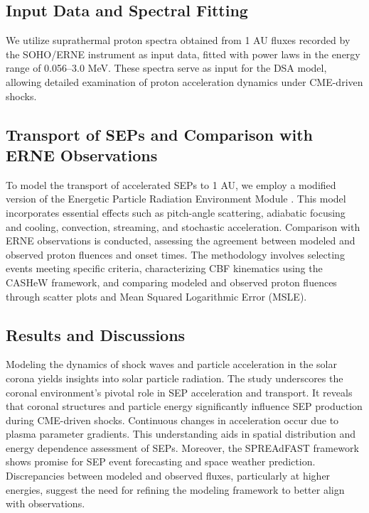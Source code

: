 \subsection{Input Data and Spectral Fitting}
We utilize suprathermal proton spectra obtained from 1 AU fluxes recorded by the SOHO/ERNE instrument \citep{torsti_1995} as input data, fitted with power laws in the energy range of 0.056–3.0 MeV. These spectra serve as input for the DSA model, allowing detailed examination of proton acceleration dynamics under CME-driven shocks.

\subsection{Transport of SEPs and Comparison with ERNE Observations}
To model the transport of accelerated SEPs to 1 AU, we employ a modified version of the Energetic Particle Radiation Environment Module \citep[EPREM]{schwadron_2010}. This model incorporates essential effects such as pitch-angle scattering, adiabatic focusing and cooling, convection, streaming, and stochastic acceleration. Comparison with ERNE observations is conducted, assessing the agreement between modeled and observed proton fluences and onset times.
The methodology involves selecting events meeting specific criteria, characterizing CBF kinematics using the CASHeW framework, and comparing modeled and observed proton fluences through scatter plots and Mean Squared Logarithmic Error (MSLE).

\subsection{Results and Discussions}
Modeling the dynamics of shock waves and particle acceleration in the solar corona yields insights into solar particle radiation. The study underscores the coronal environment's pivotal role in SEP acceleration and transport. It reveals that coronal structures and particle energy significantly influence SEP production during CME-driven shocks. Continuous changes in acceleration occur due to plasma parameter gradients. This understanding aids in spatial distribution and energy dependence assessment of SEPs. Moreover, the SPREAdFAST framework shows promise for SEP event forecasting and space weather prediction. Discrepancies between modeled and observed fluxes, particularly at higher energies, suggest the need for refining the modeling framework to better align with observations.


